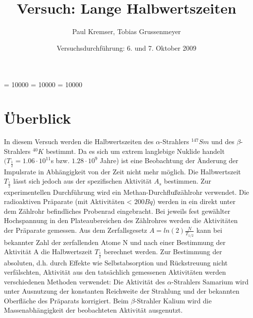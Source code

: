 \documentclass[12pt]{article}
\newcommand{\changefont}[3]{
\fontfamily{#1} \fontseries{#2} \fontshape{#3} \selectfont}
\begin{document}
\clubpenalty = 10000
\widowpenalty = 10000 
\displaywidowpenalty = 10000

\onehalfspacing
\changefont{ptm}{m}{n} 

\begin{titlepage}
\author{Paul Kremser, Tobias Grussenmeyer}
\title{Versuch: Lange Halbwertszeiten}
\date{Versuchsdurchführung: 6. und 7. Oktober 2009} 
\maketitle
\thispagestyle{empty}
\end{titlepage}


\tableofcontents
\thispagestyle{empty}
\newpage
{}
\section{Überblick}
In diesem Versuch werden die Halbwertszeiten des $\alpha$-Strahlers $ ^{147}Sm$ und des $\beta$- Strahlers $^{40}K$ bestimmt. Da es sich um extrem langlebige Nuklide handelt $(T_{\frac{1}{2}} =1.06 \cdot 10^{11}$s  bzw. $1.28 \cdot 10^9$ Jahre) ist eine Beobachtung der Änderung der Impulsrate in Abhängigkeit von der Zeit nicht mehr möglich. Die Halbwertszeit $T_{\frac{1}{2}}$ lässt sich jedoch aus der spezifischen Aktivität $A_s$ bestimmen. Zur experimentellen Durchführung wird ein Methan-Durchflußzählrohr verwendet. Die radioaktiven Präparate (mit Aktivitäten < $200 Bq$) werden in ein direkt unter dem Zählrohr befindliches Probenrad eingebracht. Bei jeweils fest gewählter Hochspannung in den Plateaubereichen des Zählrohres werden die Aktivitäten der Präparate gemessen. Aus dem Zerfallsgesetz $A = ln(2) \frac{N}{T_{1/2}}$ kann bei bekannter Zahl der zerfallenden Atome N und nach einer Bestimmung der Aktivität A die Halbwertszeit $T_{\frac{1}{2}}$ berechnet werden. Zur Bestimmung der absoluten, d.h. durch Effekte wie Selbstabsorption und Rückstreuung nicht verfälschten, Aktivität aus den tatsächlich gemessenen Aktivitäten werden verschiedenen Methoden verwendet: Die Aktivität des $\alpha$-Strahlers Samarium wird
unter Ausnutzung der konstanten Reichweite der Strahlung und der bekannten Oberfläche des Präparats korrigiert. Beim $\beta$-Strahler Kalium wird die Massenabhängigkeit der beobachteten Aktivität ausgenutzt.
\end{document}
